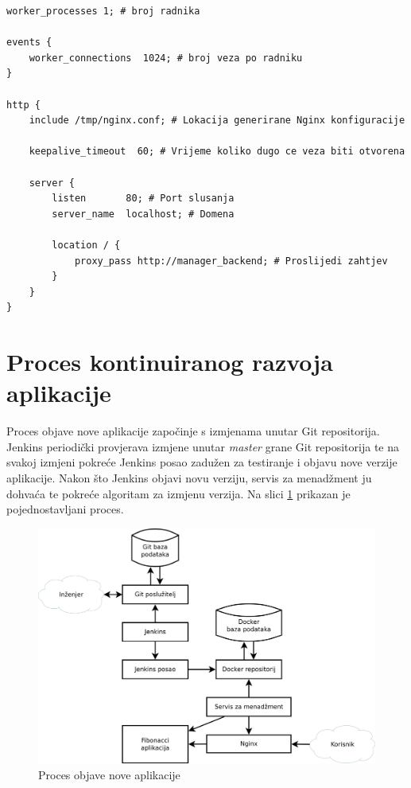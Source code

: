 \begin{lstlisting}[float=h]
worker_processes 1; # broj radnika

events {
    worker_connections  1024; # broj veza po radniku
}

http {
    include /tmp/nginx.conf; # Lokacija generirane Nginx konfiguracije

    keepalive_timeout  60; # Vrijeme koliko dugo ce veza biti otvorena

    server {
        listen       80; # Port slusanja
        server_name  localhost; # Domena

        location / {
            proxy_pass http://manager_backend; # Proslijedi zahtjev
        }
    }
}
\end{lstlisting}

\section{Proces kontinuiranog razvoja aplikacije}
Proces objave nove aplikacije započinje s izmjenama unutar Git repositorija. Jenkins periodički
provjerava izmjene unutar \textit{master} grane Git repositorija te na svakoj izmjeni pokreće
Jenkins posao zadužen za testiranje i objavu nove verzije aplikacije. Nakon što Jenkins objavi novu
verziju, servis za menadžment ju dohvaća te pokreće algoritam za izmjenu verzija. Na slici
\ref{fig:03workflow} prikazan je pojednostavljani proces.

\begin{figure}[h]
    \centering
    \includegraphics[width=\textwidth]{img/03/workflow.png}
    \caption{Proces objave nove aplikacije}%
    \label{fig:03workflow}
\end{figure}

